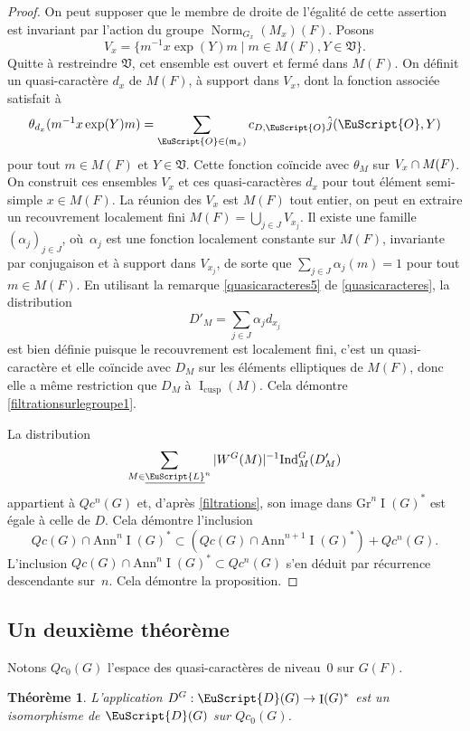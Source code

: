 \documentclass[JEP,XML,SOM,Unicode,francais]{cedram}
\let\mathcal \EuScript
\newcommand{\NoChangel}[1]{%
\expandafter\let\csname old\string#1\endcsname=#1
\let#1=\relax
\newcommand{#1}{\mathcode`l="716C\csname old\string#1\endcsname\mathcode`l="7160 }%
}
\let\sep\mid
\newcommand{\mfrm}{\mathfrak{m}}
\newcommand{\frV}{\mathfrak{V}}
\newcommand{\Ann}{\mathrm{Ann}}
\newcommand{\cusp}{\mathrm{cusp}}
\newcommand{\rell}{\mathrm{ell}} \NoChangel{\rell}
\newcommand{\Gr}{\mathrm{Gr}}
\newcommand{\Ind}{\mathrm{Ind}}
\newcommand{\Nil}{\mathrm{Nil}} \NoChangel{\Nil}
\DeclareMathOperator{\rI}{I}
\DeclareMathOperator{\Norm}{Norm}
\newcommand{\cD}{\mathcal{D}}
\newcommand{\cL}{\mathcal{L}}
\newcommand{\cO}{\mathcal{O}}
\theoremstyle{plain}
\newtheorem*{thm*}{Théorème}
\theoremstyle{definition}
\begin{document}
\begin{proof}
On peut supposer que le membre de droite de l'égalité de cette assertion est invariant par l'action du groupe $\Norm_{G_{x}}(M_{x})(F) $. Posons
\[
V_{x}=\{m^{-1}x \exp(Y)m\sep m\in M(F), Y\in \frV\}.
\]
Quitte à restreindre $\frV$, cet ensemble est ouvert et fermé dans $M(F)$. On définit un quasi-caractère $d_{x}$ de $M(F)$, à support dans $V_{x}$, dont la fonction associée satisfait à
\[
\theta_{d_{x}}(m^{-1}x \exp(Y)m)=\sum_{\cO\in \Nil(\mfrm_{x})}c_{D,\cO}\hat{j}(\cO,Y)
\]
pour tout $m\in M(F)$ et $Y\in \frV$.
Cette fonction coïncide avec $\theta_{M}$ sur $V_{x}\cap M_{\rell}(F)$. On construit ces ensembles $V_{x}$ et ces quasi-caractères $d_{x}$ pour tout élément semi-simple $x\in M(F)$. La réunion des $V_{x}$ est $M(F)$ tout entier, on peut en extraire un recouvrement localement fini $M(F)=\bigcup_{j\in J}V_{x_{j}}$. Il existe une famille $(\alpha_{j})_{j\in J}$, où~$\alpha_{j}$ est une fonction localement constante sur $M(F)$, invariante par conjugaison et à support dans $V_{x_{j}}$, de sorte que $\sum_{j\in J}\alpha_{j}(m)=1$ pour tout $m\in M(F)$. En utilisant la remarque \eqref{quasicaracteres5} de \ref{quasicaracteres}, la distribution
\[
D'_{M}=\sum_{j\in J}\alpha_{j}d_{x_{j}}
\]
est bien définie puisque le recouvrement est localement fini, c'est un quasi-caractère et elle coïncide avec $D_{M}$ sur les éléments elliptiques de $M(F)$, donc elle a même restriction que $D_{M}$ à $\rI_{\cusp}(M)$. Cela démontre \eqref{filtrationsurlegroupe1}.

La distribution
\[
\sum_{M\in \underline{\cL}^n} \vert W^G(M)\vert ^{-1}\Ind_{M}^G(D'_{M})
\]
appartient à $Qc^n(G)$ et, d'après \ref{filtrations}, son image dans $\Gr^n\rI(G)^*$ est égale à celle de $D$. Cela démontre l'inclusion
\[
Qc(G)\cap \Ann^{n}\rI(G)^*\subset (Qc(G)\cap \Ann^{n+1}\rI(G)^*)+Qc^n(G).
\]
L'inclusion $Qc(G)\cap \Ann^{n}\rI(G)^*\subset Qc^n(G)$ s'en déduit par récurrence descendante sur~$n$. Cela démontre la proposition.
\end{proof}

\subsection{Un deuxième théorème}\label{undeuxiemetheoreme}

Notons $Qc_{0}(G)$ l'espace des quasi-caractères de niveau~$0$ sur $G(F)$.

\begin{thm*}
L'application $D^G:\cD(G)\to \rI(G)^*$ est un isomorphisme de $\cD(G)$ sur $Qc_{0}(G)$.
\end{thm*}
\end{document}
